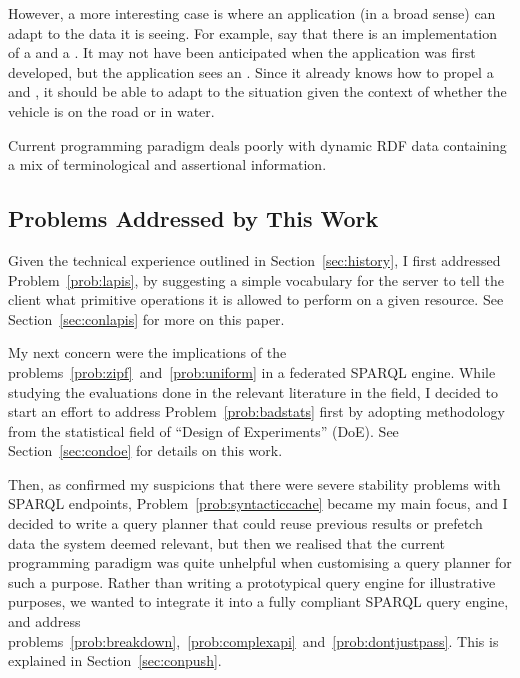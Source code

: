 However, a more interesting case is where an application (in a broad
sense) can adapt to the data it is seeing. For example, say that there
is an implementation of a  and a . It may
not have been anticipated when the application was first developed,
but the application sees an . Since it
already knows how to propel a  and , it
should be able to adapt to the situation given the context of whether
the vehicle is on the road or in water.

\begin{problem}\label{prob:dynaprog}
Current programming paradigm deals poorly with dynamic RDF data
containing a mix of terminological and assertional information.
\end{problem}


\subsection{Problems Addressed by This Work}\label{sec:probaddress}

Given the technical experience outlined in Section~\ref{sec:history},
I first addressed Problem~\ref{prob:lapis}, by suggesting a simple
vocabulary for the server to tell the client what primitive operations
it is allowed to perform on a given resource. See
Section~\ref{sec:conlapis} for more on this paper.

My next concern were the implications of the
problems~\ref{prob:zipf}~and~\ref{prob:uniform} in a federated SPARQL
engine. While studying the evaluations done in the relevant literature
in the field, I decided to start an effort to address
Problem~\ref{prob:badstats} first by adopting methodology from the
statistical field of ``Design of Experiments'' (DoE). See
Section~\ref{sec:condoe} for details on this work.

Then, as \cite{buil2013sparql} confirmed my suspicions that there were
severe stability problems with SPARQL endpoints,
Problem~\ref{prob:syntacticcache} became my main focus, and I decided
to write a query planner that could reuse previous results or prefetch
data the system deemed relevant, but then we realised that the current
programming paradigm was quite unhelpful when customising a query
planner for such a purpose. Rather than writing a prototypical query
engine for illustrative purposes, we wanted to integrate it into a
fully compliant SPARQL query engine, and address
problems~\ref{prob:breakdown},~\ref{prob:complexapi}~and~\ref{prob:dontjustpass}. This
is explained in Section~\ref{sec:conpush}.


